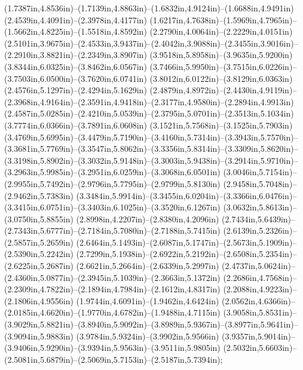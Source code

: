 (1.7387in,4.8536in)--(1.7139in,4.8863in)--(1.6832in,4.9124in)--(1.6688in,4.9491in) (2.4539in,4.4091in)--(2.3978in,4.4177in) (1.6217in,4.7638in)--(1.5969in,4.7965in)--(1.5662in,4.8225in)--(1.5518in,4.8592in) (2.2790in,4.0064in)--(2.2229in,4.0151in) (2.5101in,3.9675in)--(2.4533in,3.9437in)--(2.4042in,3.9088in)--(2.3455in,3.9016in)--(2.2910in,3.8821in)--(2.2349in,3.8907in) (3.9518in,5.8958in)--(3.9635in,5.9200in) (3.8344in,6.0325in)--(3.8462in,6.0567in) (3.7466in,5.9950in)--(3.7515in,6.0226in)--(3.7503in,6.0500in)--(3.7620in,6.0741in) (3.8012in,6.0122in)--(3.8129in,6.0363in) (2.4576in,5.1297in)--(2.4294in,5.1629in) (2.4879in,4.8972in)--(2.4430in,4.9119in)--(2.3968in,4.9164in)--(2.3591in,4.9418in)--(2.3177in,4.9580in)--(2.2894in,4.9913in) (2.4587in,5.0285in)--(2.4210in,5.0539in)--(2.3795in,5.0701in)--(2.3513in,5.1034in) (3.7774in,6.0366in)--(3.7891in,6.0608in) (3.1521in,5.7568in)--(3.1525in,5.7903in) (3.4769in,5.6995in)--(3.4479in,5.7190in)--(3.4160in,5.7314in)--(3.3943in,5.7570in)--(3.3681in,5.7769in)--(3.3547in,5.8062in)--(3.3356in,5.8314in)--(3.3309in,5.8620in)--(3.3198in,5.8902in)--(3.3032in,5.9148in)--(3.3003in,5.9438in)--(3.2914in,5.9710in)--(3.2963in,5.9985in)--(3.2951in,6.0259in)--(3.3068in,6.0501in) (3.0046in,5.7154in)--(2.9955in,5.7492in)--(2.9796in,5.7795in)--(2.9799in,5.8130in) (2.9458in,5.7048in)--(2.9462in,5.7383in) (3.3484in,5.9914in)--(3.3455in,6.0204in)--(3.3366in,6.0476in)--(3.3415in,6.0751in)--(3.3403in,6.1025in)--(3.3520in,6.1267in) (3.0632in,5.8613in)--(3.0750in,5.8855in) (2.8998in,4.2207in)--(2.8380in,4.2096in) (2.7434in,5.6439in)--(2.7343in,5.6777in)--(2.7184in,5.7080in)--(2.7188in,5.7415in) (2.6139in,5.2326in)--(2.5857in,5.2659in) (2.6464in,5.1493in)--(2.6087in,5.1747in)--(2.5673in,5.1909in)--(2.5390in,5.2242in) (2.7299in,5.1938in)--(2.6922in,5.2192in)--(2.6508in,5.2354in)--(2.6225in,5.2687in) (2.6621in,5.2664in)--(2.6339in,5.2997in) (2.4737in,5.0624in)--(2.4360in,5.0877in)--(2.3945in,5.1039in)--(2.3663in,5.1372in) (2.2686in,4.7568in)--(2.2309in,4.7822in)--(2.1894in,4.7984in)--(2.1612in,4.8317in) (2.2088in,4.9223in)--(2.1806in,4.9556in) (1.9744in,4.6091in)--(1.9462in,4.6424in) (2.0562in,4.6366in)--(2.0185in,4.6620in)--(1.9770in,4.6782in)--(1.9488in,4.7115in) (3.9058in,5.8531in)--(3.9029in,5.8821in)--(3.8940in,5.9092in)--(3.8989in,5.9367in)--(3.8977in,5.9641in)--(3.9094in,5.9883in) (3.9784in,5.9324in)--(3.9902in,5.9566in) (3.9357in,5.9014in)--(3.9406in,5.9290in)--(3.9394in,5.9563in)--(3.9511in,5.9805in) (2.5032in,5.6603in)--(2.5081in,5.6879in)--(2.5069in,5.7153in)--(2.5187in,5.7394in);
